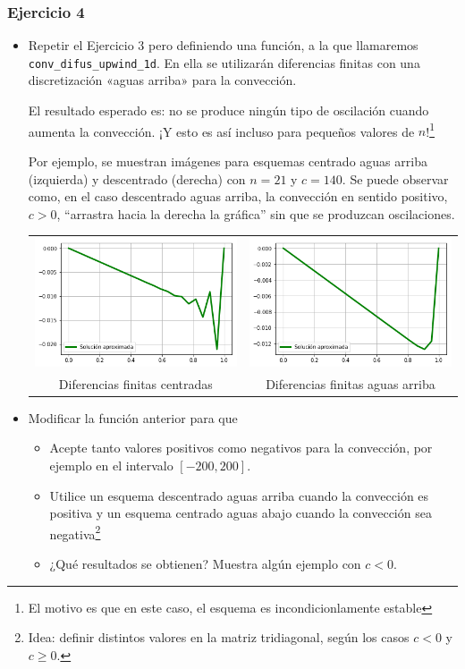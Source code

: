 \documentclass[11pt,spanish,a4wide]{article}
\begin{document}
\subsubsection{Ejercicio 4}
\begin{itemize}
\item Repetir el Ejercicio 3 pero definiendo una función, a la que
  llamaremos \texttt{conv\_difus\_upwind\_1d}. En ella se utilizarán
  diferencias finitas con una discretización «aguas arriba» para la
  convección.

  El resultado esperado es: no se produce ningún tipo de
  oscilación cuando aumenta la convección. ¡Y esto es así incluso para
  pequeños valores de $n$!\footnote{El motivo es que en este caso, el
    esquema es incondicionlamente estable}

  Por ejemplo, se muestran imágenes para esquemas centrado aguas
  arriba (izquierda) y descentrado (derecha) con $n=21$ y $c=140$. Se
  puede observar como, en el caso descentrado aguas arriba, la
  convección en sentido positivo, $c>0$, ``arrastra hacia la derecha
  la gráfica'' sin que se produzcan oscilaciones.
  \begin{center}
  \begin{tabular}{cc}
    \includegraphics[width=0.47\linewidth]{conv-dif-centrado}&
    \includegraphics[width=0.47\linewidth]{conv-dif-descentrado}
    \\
    \small Diferencias finitas centradas
    &
    \small Diferencias finitas aguas arriba
  \end{tabular}
\end{center}
\item Modificar la función anterior para que
  \begin{itemize}
  \item Acepte tanto valores positivos como negativos para la
    convección, por ejemplo en el intervalo $[-200,200]$.
  \item Utilice un esquema descentrado aguas arriba cuando la convección
    es positiva y un esquema centrado aguas abajo cuando la convección
    sea negativa\footnote{Idea: definir distintos valores en la matriz
      tridiagonal, según los casos $c<0$ y $c\ge 0$.}
  \item ¿Qué resultados se obtienen? Muestra algún ejemplo con $c<0$.
  \end{itemize}
\end{itemize}
\end{document}
